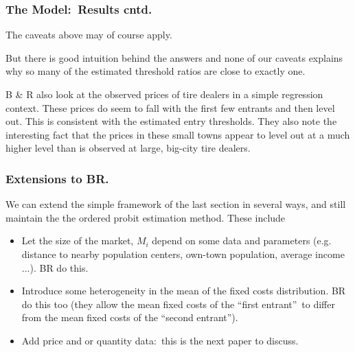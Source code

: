 \documentclass[notes=show]{beamer}
\begin{document}
\begin{frame}%

\frametitle{The Model:\ Results cntd.}

The caveats above may of course apply.

\bigskip

But there is good intuition behind the answers and none of our caveats
explains why so many of the estimated threshold ratios are close to exactly
one.

\bigskip

B \& R also look at the observed prices of tire dealers in a simple
regression context. These prices do seem to fall with the first few entrants
and then level out. This is consistent with the estimated entry thresholds.
They also note the interesting fact that the prices in these small towns
appear to level out at a much higher level than is observed at large,
big-city tire dealers.

\end{frame}%

\begin{frame}%

\frametitle{Extensions to BR.}

We can extend the simple framework of the last section in several ways, and
still maintain the the ordered probit estimation method. These include

\begin{itemize}
\item Let the size of the market, $M_{i}$ depend on some data and parameters
(e.g. distance to nearby population centers, own-town population, average
income ...). BR do this.

\item Introduce some heterogeneity in the mean of the fixed costs
distribution. BR do this too (they allow the mean fixed costs of the
\textquotedblleft first entrant\textquotedblright\ to differ from the mean
fixed costs of the \textquotedblleft second entrant\textquotedblright ).

\item Add price and or quantity data:\ this is the next paper to discuss.
\end{itemize}

\end{frame}%
\end{document}
